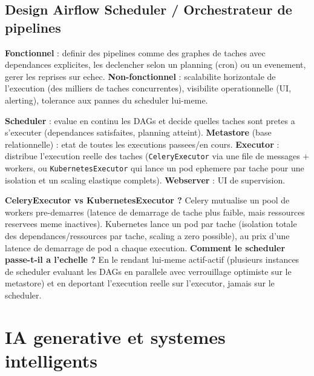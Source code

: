\documentclass[11pt,a4paper]{article}
\newenvironment{sujet}[1]{%
  \subsection{#1}
}{%
  \bigskip
}
\begin{document}
\begin{sujet}{Design Airflow Scheduler / Orchestrateur de pipelines}

\begin{req}
\textbf{Fonctionnel} : definir des pipelines comme des graphes de taches avec dependances explicites, les declencher selon un planning (cron) ou un evenement, gerer les reprises sur echec. \textbf{Non-fonctionnel} : scalabilite horizontale de l'execution (des milliers de taches concurrentes), visibilite operationnelle (UI, alerting), tolerance aux pannes du scheduler lui-meme.
\end{req}

\begin{archbox}
\textbf{Scheduler} : evalue en continu les DAGs et decide quelles taches sont pretes a s'executer (dependances satisfaites, planning atteint). \textbf{Metastore} (base relationnelle) : etat de toutes les executions passees/en cours. \textbf{Executor} : distribue l'execution reelle des taches (\texttt{CeleryExecutor} via une file de messages + workers, ou \texttt{KubernetesExecutor} qui lance un pod ephemere par tache pour une isolation et un scaling elastique complets). \textbf{Webserver} : UI de supervision.
\end{archbox}

\begin{tradeoff}
\textbf{CeleryExecutor vs KubernetesExecutor ?} Celery mutualise un pool de workers pre-demarres (latence de demarrage de tache plus faible, mais ressources reservees meme inactives). Kubernetes lance un pod par tache (isolation totale des dependances/ressources par tache, scaling a zero possible), au prix d'une latence de demarrage de pod a chaque execution. \textbf{Comment le scheduler passe-t-il a l'echelle ?} En le rendant lui-meme actif-actif (plusieurs instances de scheduler evaluant les DAGs en parallele avec verrouillage optimiste sur le metastore) et en deportant l'execution reelle sur l'executor, jamais sur le scheduler.
\end{tradeoff}

\end{sujet}

\newpage
\section{IA generative et systemes intelligents}
\end{document}

